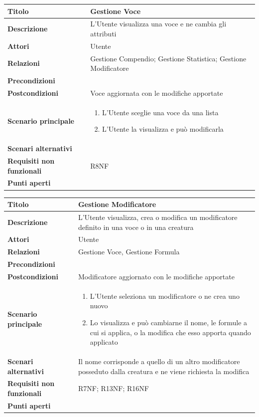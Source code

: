 \documentclass[a4paper, 11pt]{article}
\begin{document}
\begin{center}
\begin{tabular}{ |p{5cm}|p{9.5cm}|  }
\hline
\textbf{Titolo} & Gestione Voce \\
\hline
\textbf{Descrizione} & L'Utente visualizza una voce e ne cambia gli attributi \\
\hline
\textbf{Attori} & Utente  \\
\hline
\textbf{Relazioni} & Gestione Compendio; Gestione Statistica; Gestione Modificatore \\
\hline
\textbf{Precondizioni} &  \\
\hline
\textbf{Postcondizioni} & Voce aggiornata con le modifiche apportate \\
\hline
\textbf{Scenario principale} & 
\begin{enumerate}
    \item L'Utente sceglie una voce da una lista
    \item L'Utente la visualizza e può modificarla
\end{enumerate}
\\
\hline
\textbf{Scenari alternativi} & \\
\hline
    \textbf{Requisiti non funzionali} & R8NF \\
\hline
\textbf{Punti aperti} &  \\
\hline
\end{tabular}

\vspace{3em}


\begin{tabular}{ |p{5cm}|p{9.5cm}|  }
\hline
\textbf{Titolo} & Gestione Modificatore \\
\hline
\textbf{Descrizione} & L'Utente visualizza, crea o modifica un modificatore definito in una voce o in una creatura \\
\hline
\textbf{Attori} & Utente  \\
\hline
\textbf{Relazioni} & Gestione Voce, Gestione Formula \\
\hline
\textbf{Precondizioni} &  \\
\hline
\textbf{Postcondizioni} & Modificatore aggiornato con le modifiche apportate \\
\hline
\textbf{Scenario principale} & 
\begin{enumerate}
    \item L'Utente seleziona un modificatore o ne crea uno nuovo
    \item Lo visualizza e può cambiarne il nome, le formule a cui si applica, o la modifica che esso apporta quando applicato
\end{enumerate}
\\
\hline
\textbf{Scenari alternativi} &Il nome corrisponde a quello di un altro modificatore posseduto dalla creatura e ne viene richiesta la modifica \\
\hline
    \textbf{Requisiti non funzionali} &  R7NF; R13NF; R16NF \\
\hline
\textbf{Punti aperti} &  \\
\hline
\end{tabular}


\end{center}
\end{document}
